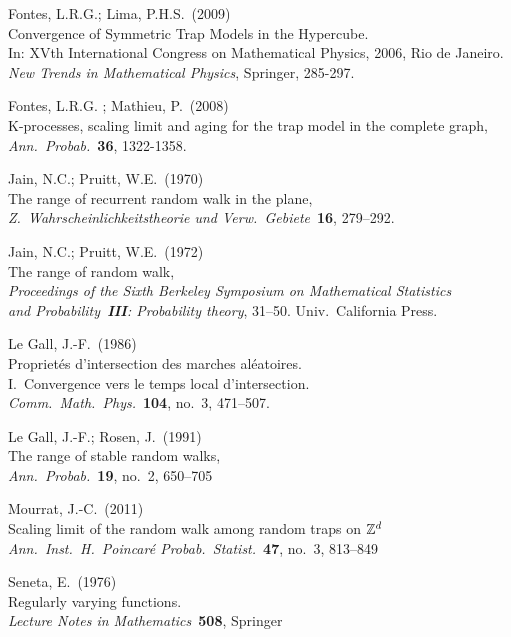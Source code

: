 \begin{thebibliography}{xxxxxx 89}
 Fontes, L.R.G.; Lima, P.H.S.~(2009)\\
Convergence of Symmetric Trap Models in the Hypercube.\\
In: XVth International Congress on Mathematical Physics, 2006, Rio de Janeiro.\\
{\em New Trends in Mathematical Physics}, Springer, 285-297.

 Fontes, L.R.G. ; Mathieu, P.~(2008)\\
K-processes, scaling limit and aging for the trap model in the complete graph,\\
{\em Ann.~Probab.}~{\bf 36}, 1322-1358. 

 Jain, N.C.; Pruitt, W.E.~(1970)\\
The range of recurrent random walk in the plane, \\
{\em Z.~Wahrscheinlichkeitstheorie und Verw.~Gebiete}~{\bf 16}, 279--292.

 Jain, N.C.; Pruitt, W.E.~(1972)\\
The range of random walk,\\ 
{\em Proceedings of the Sixth Berkeley Symposium on Mathematical Statistics\\ 
and Probability~{\bf III}: Probability theory}, 31--50. 
Univ.~California Press.


 Le Gall, J.-F.~(1986)\\
Propriet\'es  d'intersection des marches al\'eatoires.\\ I.~Convergence vers le temps local d'intersection.\\
{\em Comm.~Math.~Phys.}~{\bf 104}, no.~3, 471--507.

 Le Gall, J.-F.; Rosen, J.~(1991)\\
The range of stable random walks, \\
{\em Ann.~Probab.}~{\bf 19}, no.~2, 650--705

 Mourrat, J.-C.~(2011)\\
Scaling limit of the random walk among random traps on ${\mathbb Z}^d$\\
{\em Ann.~Inst.~H.~Poincaré Probab.~Statist.}~{\bf 47}, no.~3, 813--849 


 Seneta, E.~(1976)\\ Regularly varying functions.\\ {\em Lecture Notes in Mathematics}~{\bf 508}, Springer


\end{thebibliography}
